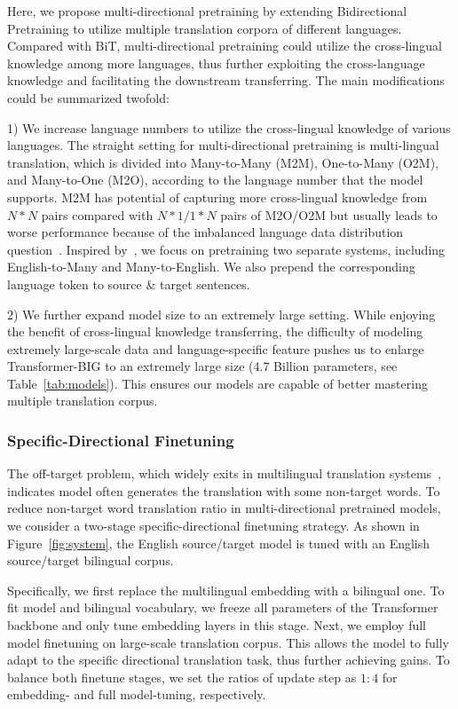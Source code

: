\documentclass[11pt,a4paper]{article}
\newcommand{\zct}{\color{black}}
\begin{document}
Here, we propose multi-directional pretraining by extending Bidirectional Pretraining \cite[BiT]{ding2021improving} to utilize multiple translation {\zct corpora} of different languages. Compared with BiT, multi-directional pretraining could utilize the cross-lingual knowledge among more languages, thus further exploiting the cross-language knowledge and facilitating the downstream transferring.
The main modifications could be summarized {\zct twofold}: 

1) We increase language numbers to utilize the cross-lingual knowledge of various languages. 
The straight setting for multi-directional pretraining is multi-lingual translation, which is divided into Many-to-Many (M2M), One-to-Many (O2M), and Many-to-One (M2O), according to the language number that the model supports. M2M has potential of capturing more cross-lingual knowledge from $N*N$ pairs compared with $N*1/1*N$ pairs of M2O/O2M but usually leads to worse performance because of the imbalanced language data distribution question~\cite{freitag2020complete}.
Inspired by~\cite{facebook2021}, we focus on pretraining two separate systems, including English-to-Many and Many-to-English. We also prepend the corresponding language token to source \& target sentences.

2) We further expand model size to an extremely large setting. While enjoying the benefit of cross-lingual knowledge transferring, the difficulty of modeling extremely large-scale data and language-specific feature pushes us to enlarge Transformer-\textsc{BIG} to an extremely large size {\zct (4.7 Billion parameters, see Table~\ref{tab:models})}. 
This ensures our models are capable of better mastering multiple translation corpus.

\subsubsection{Specific-Directional Finetuning}
\label{ssec:sd-ft}
{\zct The off-target problem, which widely exits in multilingual translation systems~\cite{yang-etal-2021-improving-multilingual}, indicates model often generates the translation with some non-target words.}
To reduce non-target word translation ratio in multi-directional pretrained models, we consider a two-stage specific-directional finetuning strategy. As shown in Figure~\ref{fig:system}, the English source/target model is tuned with an English source/target bilingual corpus.

Specifically, we first replace the multilingual embedding with a bilingual one. To fit model and bilingual vocabulary, we freeze all parameters of the Transformer backbone and only tune embedding layers in this stage. Next, we employ full model finetuning on large-scale translation corpus. This allows {\zct the} model to fully adapt to the specific directional translation task, thus further achieving gains. To balance both finetune stages, we set the ratios of update step as $1:4$ for embedding- and full model-tuning, respectively.
\end{document}
